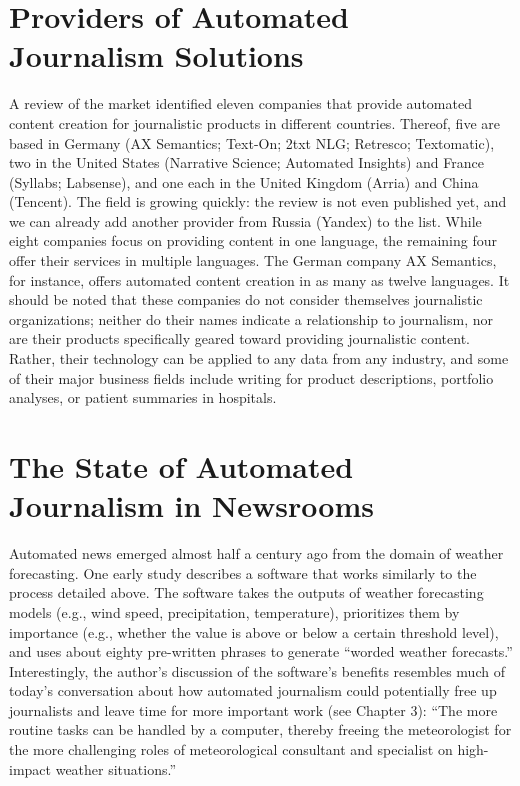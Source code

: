 \documentclass[notoc, symmetric, nobib, nols]{towcenter-guideto-book}
\begin{document}
\section{Providers of Automated Journalism Solutions}

A review of the market identified eleven companies that provide automated content creation for journalistic products in different countries.\autocite{doerr15} Thereof, five are based in Germany (AX Semantics; Text-On; 2txt NLG; Retresco; Textomatic), two in the United States (Narrative Science; Automated Insights) and France (Syllabs; Labsense), and one each in the United Kingdom (Arria) and China (Tencent). The field is growing quickly: the review is not even published yet, and we can already add another provider from Russia (Yandex) to the list. While eight companies focus on providing content in one language, the remaining four offer their services in multiple languages. The German company AX Semantics, for instance, offers automated content creation in as many as twelve languages. It should be noted that these companies do not consider themselves journalistic organizations; neither do their names indicate a relationship to journalism, nor are their products specifically geared toward providing journalistic content. Rather, their technology can be applied to any data from any industry, and some of their major business fields include writing for product descriptions, portfolio analyses, or patient summaries in hospitals. 

\section{The State of Automated Journalism in Newsrooms}

Automated news emerged almost half a century ago from the domain of weather forecasting. One early study describes a software that works similarly to the process detailed above. The software takes the outputs of weather forecasting models (e.g., wind speed, precipitation, temperature), prioritizes them by importance (e.g., whether the value is above or below a certain threshold level), and uses about eighty pre-written phrases to generate ``worded weather forecasts.'' Interestingly, the author's discussion of the software's benefits resembles much of today's conversation about how automated journalism could potentially free up journalists and leave time for more important work (see Chapter 3): ``The more routine tasks can be handled by a computer, thereby freeing the meteorologist for the more challenging roles of meteorological consultant and specialist on high-impact weather situations.''\autocite{glahn70}
\end{document}
